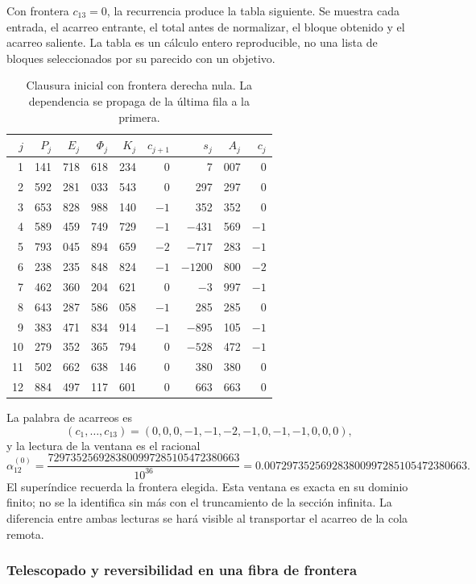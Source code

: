Con frontera \(c_{13}=0\), la recurrencia produce la tabla siguiente.
Se muestra cada entrada, el acarreo entrante, el total antes de normalizar,
el bloque obtenido y el acarreo saliente. La tabla es un cálculo entero
reproducible, no una lista de bloques seleccionados por su parecido con
un objetivo.

\begin{table}[htbp]
\centering
\small
\setlength{\tabcolsep}{3.5pt}
\begin{tabular}{r|rrrr|rr|rr}
\hline
\(j\)&\(P_j\)&\(E_j\)&\(\Phi_j\)&\(K_j\)&\(c_{j+1}\)&\(s_j\)&\(A_j\)&\(c_j\)\\
\hline
1&141&718&618&234&0&7&007&0\\
2&592&281&033&543&0&297&297&0\\
3&653&828&988&140&\(-1\)&352&352&0\\
4&589&459&749&729&\(-1\)&\(-431\)&569&\(-1\)\\
5&793&045&894&659&\(-2\)&\(-717\)&283&\(-1\)\\
6&238&235&848&824&\(-1\)&\(-1200\)&800&\(-2\)\\
7&462&360&204&621&0&\(-3\)&997&\(-1\)\\
8&643&287&586&058&\(-1\)&285&285&0\\
9&383&471&834&914&\(-1\)&\(-895\)&105&\(-1\)\\
10&279&352&365&794&0&\(-528\)&472&\(-1\)\\
11&502&662&638&146&0&380&380&0\\
12&884&497&117&601&0&663&663&0\\
\hline
\end{tabular}
\caption{Clausura inicial con frontera derecha nula. La dependencia se propaga de la última fila a la primera.}
\label{tab:alpha-ventana}
\end{table}

La palabra de acarreos es
\[
 (c_1,\ldots,c_{13})=(0,0,0,-1,-1,-2,-1,0,-1,-1,0,0,0),
\]
y la lectura de la ventana es el racional
\begin{equation}
 \alpha_{12}^{(0)}
 =\frac{7297352569283800997285105472380663}{10^{36}}
 =0.007297352569283800997285105472380663.
 \label{eq:alpha-ventana-cero}
\end{equation}
El superíndice recuerda la frontera elegida. Esta ventana es exacta en su
dominio finito; no se la identifica sin más con el truncamiento de la
sección infinita. La diferencia entre ambas lecturas se hará visible al
transportar el acarreo de la cola remota.

\subsubsection{Telescopado y reversibilidad en una fibra de frontera}
\label{subsec:alpha-telescopia}

